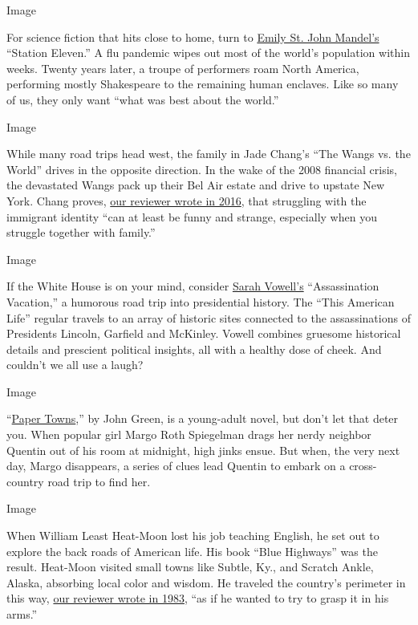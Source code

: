 Image

For science fiction that hits close to home, turn to
\href{https://www.nytimes.com/2014/09/14/books/review/station-eleven-by-emily-st-john-mandel.html}{Emily
St. John Mandel's} ``Station Eleven.'' A flu pandemic wipes out most of
the world's population within weeks. Twenty years later, a troupe of
performers roam North America, performing mostly Shakespeare to the
remaining human enclaves. Like so many of us, they only want ``what was
best about the world.''

Image

While many road trips head west, the family in Jade Chang's ``The Wangs
vs. the World'' drives in the opposite direction. In the wake of the
2008 financial crisis, the devastated Wangs pack up their Bel Air estate
and drive to upstate New York. Chang proves,
\href{https://www.nytimes.com/2016/10/16/books/review/wangs-vs-the-world-jade-chang.html}{our
reviewer wrote in 2016}, that struggling with the immigrant identity
``can at least be funny and strange, especially when you struggle
together with family.''

Image

If the White House is on your mind, consider
\href{https://www.nytimes.com/2005/05/08/books/review/assassination-vacation-dead-presidents.html}{Sarah
Vowell's} ``Assassination Vacation,'' a humorous road trip into
presidential history. The ``This American Life'' regular travels to an
array of historic sites connected to the assassinations of Presidents
Lincoln, Garfield and McKinley. Vowell combines gruesome historical
details and prescient political insights, all with a healthy dose of
cheek. And couldn't we all use a laugh?

Image

``\href{https://www.nytimes.com/2008/12/07/books/review/Sutton2-t.html}{Paper
Towns},'' by John Green, is a young-adult novel, but don't let that
deter you. When popular girl Margo Roth Spiegelman drags her nerdy
neighbor Quentin out of his room at midnight, high jinks ensue. But
when, the very next day, Margo disappears, a series of clues lead
Quentin to embark on a cross-country road trip to find her.

Image

When William Least Heat-Moon lost his job teaching English, he set out
to explore the back roads of American life. His book ``Blue Highways''
was the result. Heat-Moon visited small towns like Subtle, Ky., and
Scratch Ankle, Alaska, absorbing local color and wisdom. He traveled the
country's perimeter in this way,
\href{https://www.nytimes.com/1983/01/13/books/books-of-the-times-159989.html}{our
reviewer wrote in 1983}, ``as if he wanted to try to grasp it in his
arms.''

